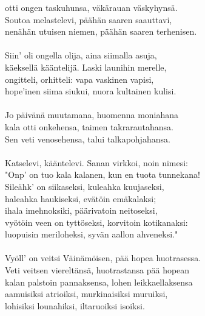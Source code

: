 otti ongen taskuhunsa, väkärauan väskyhynsä.             \\
Soutoa melastelevi, päähän saaren saauttavi,             \\
nenähän utuisen niemen, päähän saaren terhenisen.        \\
                                                         \\
Siin' oli ongella olija, aina siimalla asuja,            \\
käeksellä kääntelijä. Laski launihin merelle,            \\
ongitteli, orhitteli: vapa vaskinen vapisi,              \\
hope'inen siima siukui, nuora kultainen kulisi.          \\
                                                         \\
Jo päivänä muutamana, huomenna moniahana                 \\
kala otti onkehensa, taimen takrarautahansa.             \\
Sen veti venosehensa, talui talkapohjahansa.             \\
                                                         \\
Katselevi, kääntelevi. Sanan virkkoi, noin nimesi:       \\
"Onp' on tuo kala kalanen, kun en tuota tunnekana!       \\
Sileähk' on siikaseksi, kuleahka kuujaseksi,             \\
haleahka haukiseksi, evätöin emäkalaksi;                 \\
ihala imehnoksiki, päärivatoin neitoseksi,               \\
vyötöin veen on tyttöseksi, korvitoin kotikanaksi:       \\
luopuisin meriloheksi, syvän aallon ahveneksi."          \\
                                                         \\
Vyöll' on veitsi Väinämöisen, pää hopea huotrasessa.     \\
Veti veitsen viereltänsä, huotrastansa pää hopean        \\
kalan palstoin pannaksensa, lohen leikkaellaksensa       \\
aamuisiksi atrioiksi, murkinaisiksi muruiksi,            \\
lohisiksi lounahiksi, iltaruoiksi isoiksi.               \\

